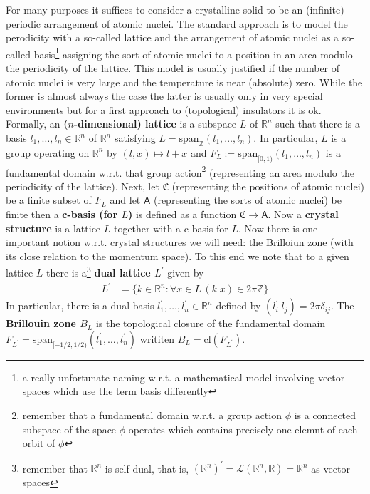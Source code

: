 For many purposes it suffices to consider a crystalline solid to be an (infinite) periodic arrangement of atomic nuclei. The standard approach is to model the perodicity with a so-called lattice and the arrangement of atomic nuclei as a so-called basis\footnote{a really unfortunate naming w.r.t. a mathematical model involving vector spaces which use the term {\glqq}basis{\grqq} differently} assigning the sort of atomic nuclei to a position in an area modulo the periodicity of the lattice. This model is usually justified if the number of atomic nuclei is very large and the temperature is near (absolute) zero. While the former is almost always the case the latter is usually only in very special environments but for a first approach to (topological) insulators it is ok.
\\
Formally, an \textbf{($n$-dimensional) lattice} is a subspace $L$ of $\mathbb{R}^{n}$ such that there is a basis $l_{1},\ldots,l_{n} \in \mathbb{R}^{n}$ of $\mathbb{R}^{n}$ satisfying $L = \mathrm{span}_{\mathbb{Z}}(l_{1},\ldots,l_{n})$. In particular, $L$ is a group operating on $\mathbb{R}^{n}$ by $(l,x) \mapsto l + x$ and $F_{L} := \mathrm{span}_{[0,1)}(l_{1},\ldots,l_{n})$ is a fundamental domain w.r.t. that group action\footnote{remember that a fundamental domain w.r.t. a group action $\phi$ is a connected subspace of the space $\phi$ operates which contains precisely one elemnt of each orbit of $\phi$} (representing an area modulo the periodicity of the lattice). Next, let $\mathfrak{C}$ (representing the positions of atomic nuclei) be a finite subset of $F_{L}$ and let $\mathsf{A}$ (representing the sorts of atomic nuclei) be finite then a \textbf{c-basis (for $L$)} is defined as a function $\mathfrak{C} \to \mathsf{A}$. Now a \textbf{crystal structure} is a lattice $L$ together with a c-basis for $L$. Now there is one important notion w.r.t. crystal structures we will need: the Brilloiun zone (with its close relation to the momentum space). To this end we note that to a given lattice $L$ there is a\footnote{remember that $\mathbb{R}^{n}$ is self dual, that is, $(\mathbb{R}^{n})^{\prime}= \mathcal{L}(\mathbb{R}^{n},\mathbb{R}) = \mathbb{R}^{n}$ as vector spaces} \textbf{dual lattice $L^{\prime}$} given by\begin{align*}
  L^{\prime}
  &=
  \lbrace
      k
      \in
      \mathbb{R}^{n}
    \colon
      \forall
      x
      \in
      L
      \,
      (k \vert x)
      \in 
      2\pi
      \mathbb{Z}
  \rbrace
\end{align*}
In particular, there is a dual basis $l_{1}^{\prime},\ldots,l_{n}^{\prime} \in \mathbb{R}^{n}$ defined by $(l_{i}^{\prime} \vert l_{j}) = 2\pi\delta_{ij}$. The \textbf{Brillouin zone $B_{L}$} is the topological closure of the fundamental domain $F_{{L}^{\prime}} = \mathrm{span}_{[-1/2,1/2)}(l_{1}^{\prime},\ldots,l_{n}^{\prime})$ writiten $B_{L} = \mathrm{cl}(F_{L^{\prime}})$.
